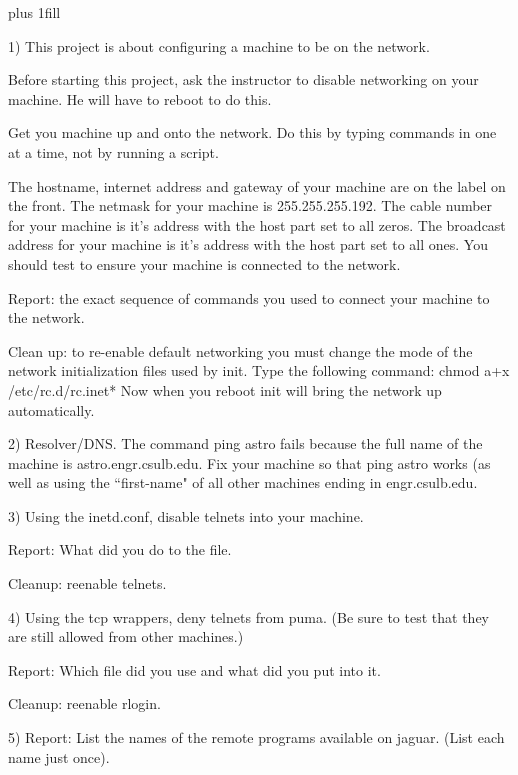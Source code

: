 
\rightskip=0pt plus 1fill

\parindent 0pt

1) This project is about configuring a machine to be on the network.

Before starting this project, ask the instructor to disable networking
on your machine. He will have to reboot to do this.

Get you machine up and onto the network.
Do this by typing commands in one at a time, not by running a script.

The hostname, internet address and gateway of your machine are on the
label on the front.
The netmask for your machine is 255.255.255.192.
The cable number for your machine is it's address with the host
part set to all zeros.
The broadcast address for your machine is it's address with the host
part set to all ones.
You should test to ensure your machine is connected to the network.

Report: the exact sequence of commands you used to connect your machine
to the network.

Clean up: to re-enable default networking you must change the mode
of the network initialization files used by {\ltt{}init}.
Type the following command:
\hfill\break
{\ltt{}chmod a+x /etc/rc.d/rc.inet*}
\hfill\break
Now when you reboot {\ltt{}init} will bring the network up automatically.

2) Resolver/DNS. The command {\ltt{}ping astro} fails because the full name
of the machine is {\ltt{}astro.engr.csulb.edu}.
Fix your machine so that {\ltt{}ping astro} works (as well as using
the ``first-name" of all other machines ending in {\ltt{}engr.csulb.edu}.

3) Using the {\ltt{}inetd.conf}, disable telnets into your machine.

Report: What did you do to the file.

Cleanup: reenable telnets.

4) Using the tcp wrappers, deny telnets from {\ltt{}puma}. (Be sure to test
that they are still allowed from other machines.)

Report: Which file did you use and what did you put into it.

Cleanup: reenable rlogin.

5) Report: List the names of the remote programs available on {\ltt{}jaguar}.
(List each name just once).

